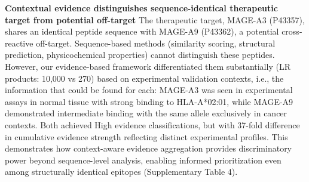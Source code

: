 \documentclass[unnumsec,webpdf,contemporary,large]{oup-authoring-template}%
\theoremstyle{thmstyleone}%
\theoremstyle{thmstyletwo}%
\theoremstyle{thmstylethree}%
\begin{document}
        \textbf{Contextual evidence distinguishes sequence-identical therapeutic target from potential off-target}
        The therapeutic target, MAGE-A3 (P43357), shares an identical peptide sequence with MAGE-A9 (P43362), a potential cross-reactive off-target. Sequence-based methods (similarity scoring, structural prediction, physicochemical properties) cannot distinguish these peptides. However, our evidence-based framework differentiated them substantially (LR products: 10,000 vs 270) based on experimental validation contexts, i.e., the information that could be found for each: MAGE-A3 was seen in experimental assays in normal tissue with strong binding to HLA-A*02:01, while MAGE-A9 demonstrated intermediate binding with the same allele exclusively in cancer contexts. Both achieved High evidence classifications, but with 37-fold difference in cumulative evidence strength reflecting distinct experimental profiles. This demonstrates how context-aware evidence aggregation provides discriminatory power beyond sequence-level analysis, enabling informed prioritization even among structurally identical epitopes (Supplementary Table 4).
    
\end{document}
